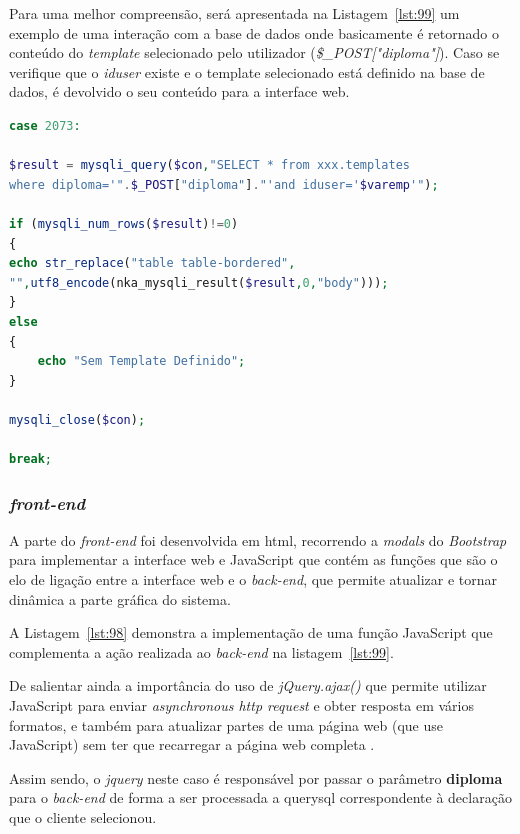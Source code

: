 Para uma melhor compreensão, será apresentada na Listagem~\ref{lst:99} um exemplo de uma interação com a base de dados onde basicamente é retornado o conteúdo do \textit{template} selecionado pelo utilizador (\textit{\$\_POST["diploma"]}). Caso se verifique que o \textit{iduser} existe e o template selecionado está definido na base de dados, é devolvido o seu conteúdo para a interface web.


\begin{lstlisting}[language={php},
                   caption={Exemplo de pedido à base de dados},
                   label=lst:99]
case 2073:

$result = mysqli_query($con,"SELECT * from xxx.templates
where diploma='".$_POST["diploma"]."'and iduser='$varemp'");

if (mysqli_num_rows($result)!=0)
{
echo str_replace("table table-bordered",
"",utf8_encode(nka_mysqli_result($result,0,"body")));
}
else
{
	echo "Sem Template Definido";
}

mysqli_close($con);

break;
\end{lstlisting}
\subsubsection{\textit{front-end}}

A parte do \textit{front-end} foi desenvolvida em \acrshort{html}, recorrendo a \textit{modals} do \textit{Bootstrap} para implementar a interface web e JavaScript que contém as funções que são o elo de ligação entre a interface web e o \textit{back-end}, que permite atualizar e tornar dinâmica a parte gráfica do sistema.

A Listagem~\ref{lst:98} demonstra a implementação de uma função JavaScript que complementa a ação realizada ao \textit{back-end} na listagem~\ref{lst:99}.

De salientar ainda a importância do uso de \textit{jQuery.ajax()} que permite utilizar JavaScript para enviar \textit{asynchronous http request} e obter resposta em vários formatos, e também para atualizar partes de uma página web (que use JavaScript) sem ter que recarregar a página web completa \citep{jquery}.

Assim sendo, o \textit{jquery} neste caso é responsável por passar o parâmetro \textbf{diploma} para o \textit{back-end} de forma a ser processada a query\acrshort{sql} correspondente à declaração que o cliente selecionou.\newpage



